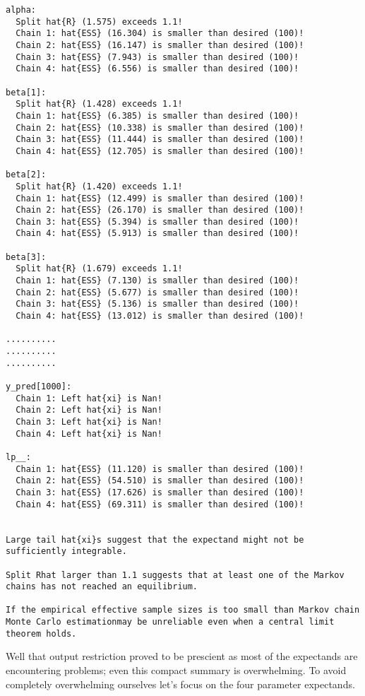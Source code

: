 \documentclass[
  letterpaper,
  DIV=11,
  numbers=noendperiod]{scrartcl}
\begin{document}
\begin{verbatim}
alpha:
  Split hat{R} (1.575) exceeds 1.1!
  Chain 1: hat{ESS} (16.304) is smaller than desired (100)!
  Chain 2: hat{ESS} (16.147) is smaller than desired (100)!
  Chain 3: hat{ESS} (7.943) is smaller than desired (100)!
  Chain 4: hat{ESS} (6.556) is smaller than desired (100)!

beta[1]:
  Split hat{R} (1.428) exceeds 1.1!
  Chain 1: hat{ESS} (6.385) is smaller than desired (100)!
  Chain 2: hat{ESS} (10.338) is smaller than desired (100)!
  Chain 3: hat{ESS} (11.444) is smaller than desired (100)!
  Chain 4: hat{ESS} (12.705) is smaller than desired (100)!

beta[2]:
  Split hat{R} (1.420) exceeds 1.1!
  Chain 1: hat{ESS} (12.499) is smaller than desired (100)!
  Chain 2: hat{ESS} (26.170) is smaller than desired (100)!
  Chain 3: hat{ESS} (5.394) is smaller than desired (100)!
  Chain 4: hat{ESS} (5.913) is smaller than desired (100)!

beta[3]:
  Split hat{R} (1.679) exceeds 1.1!
  Chain 1: hat{ESS} (7.130) is smaller than desired (100)!
  Chain 2: hat{ESS} (5.677) is smaller than desired (100)!
  Chain 3: hat{ESS} (5.136) is smaller than desired (100)!
  Chain 4: hat{ESS} (13.012) is smaller than desired (100)!

..........
..........
..........

y_pred[1000]:
  Chain 1: Left hat{xi} is Nan!
  Chain 2: Left hat{xi} is Nan!
  Chain 3: Left hat{xi} is Nan!
  Chain 4: Left hat{xi} is Nan!

lp__:
  Chain 1: hat{ESS} (11.120) is smaller than desired (100)!
  Chain 2: hat{ESS} (54.510) is smaller than desired (100)!
  Chain 3: hat{ESS} (17.626) is smaller than desired (100)!
  Chain 4: hat{ESS} (69.311) is smaller than desired (100)!


Large tail hat{xi}s suggest that the expectand might not be
sufficiently integrable.

Split Rhat larger than 1.1 suggests that at least one of the Markov
chains has not reached an equilibrium.

If the empirical effective sample sizes is too small than Markov chain
Monte Carlo estimationmay be unreliable even when a central limit
theorem holds.
\end{verbatim}

Well that output restriction proved to be prescient as most of the
expectands are encountering problems; even this compact summary is
overwhelming. To avoid completely overwhelming ourselves let's focus on
the four parameter expectands.
\end{document}
